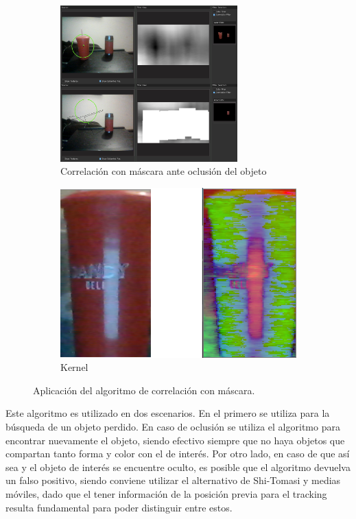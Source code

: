 \begin{figure}[H]
\centering

		\begin{subfigure}{.5\textwidth}
		\centering
		\includegraphics[width=0.75\textwidth]{Imagenes/corrmask.png}
		\caption{Correlación con máscara ante oclusión del objeto}
		\label{fig:sqdiff2}
	\end{subfigure}
	\begin{subfigure}{.1\textwidth}
		\centering
		\includegraphics[width=1.5\textwidth]{Imagenes/kernelhsv.png}
		\caption{Kernel}
		\label{fig:kernel2}
	\end{subfigure}
	\caption{Aplicación del algoritmo de correlación con máscara.}
	\label{fig:corrtest2}
\end{figure}

Este algoritmo es utilizado en dos escenarios. En el primero se utiliza para la búsqueda de un objeto perdido. En caso de oclusión se utiliza el algoritmo para encontrar nuevamente el objeto, siendo efectivo siempre que no haya objetos que compartan tanto forma y color con el de interés. Por otro lado, en caso de que así sea y el objeto de interés se encuentre oculto, es posible que el algoritmo devuelva un falso positivo, siendo conviene utilizar el alternativo de Shi-Tomasi y medias móviles, dado que el tener información de la posición previa para el tracking resulta fundamental para poder distinguir entre estos.

